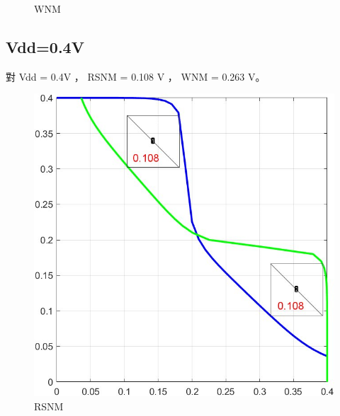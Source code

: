 \documentclass{article}
\begin{document}
\begin{figure}[H]
\begin{minipage}[t]{0.45\textwidth}
    \caption{WNM}
    \label{w6}
    \end{minipage}
    \end{figure}

    \subsection{Vdd=0.4V}

    對 Vdd = 0.4V ， RSNM = 0.108 V ， WNM = 0.263 V。

    \begin{figure}[H]
      \centering
      \begin{minipage}[t]{0.45\textwidth}
      \centering
          \includegraphics[width=\linewidth]{./img/2024-01-11-23-35-36.png}
      \caption{RSNM}
      \label{r4}
      \end{minipage}
      \qquad
      \begin{minipage}[t]{0.45\textwidth}
      \centering

\end{minipage}
\end{figure}
\end{document}
